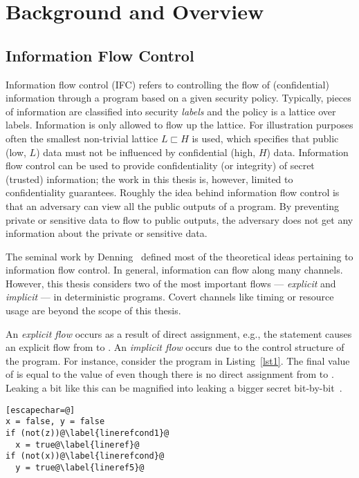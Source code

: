 \chapter{Background and Overview}
\label{ch:background}

\section{Information Flow Control}
Information flow control (IFC) refers to controlling the flow of
(confidential) information through a program based on a given security
policy. Typically, pieces of information are classified into security
\emph{labels} and the policy is a lattice over labels. Information is only
allowed to flow up the lattice. For illustration purposes often the
smallest non-trivial lattice $L \sqsubset H$ is used, which specifies that
public (low, $L$) data must not be influenced by confidential (high,
$H$) data. Information flow control can be used to provide
confidentiality (or integrity) of secret (trusted) information; the
work in this thesis is, however, limited to confidentiality guarantees. 
Roughly the idea behind information flow control is that an adversary
can view all the public outputs of a program. By preventing private or
sensitive data to flow to public outputs, the adversary does not get
any information about the private or sensitive data.

The seminal work by Denning~\cite{denning76,denning77,denning82}
defined most of the theoretical ideas pertaining to information flow
control. In general, information can flow along many
channels. However, this thesis considers two of the most important
flows --- \textit{explicit} and \textit{implicit} --- in deterministic
programs. Covert channels like timing or resource usage are beyond the
scope of this thesis.  

An \emph{explicit flow} occurs as a result of direct assignment, e.g.,
the statement  causes an explicit flow from
 to . An \emph{implicit flow} occurs due to the
control structure of the program. For instance, consider the program
in Listing~\ref{lst1}.  
 The final value of  is equal to the value of
 even though there is no direct assignment from 
to . Leaking a bit like this can be magnified into leaking
a bigger secret bit-by-bit~\cite{askarov}.

\begin{lstlisting}[float,caption=Implicit flow from \TT{z} to
  \TT{y},label=lst1][escapechar=@]
x = false, y = false
if (not(z))@\label{linerefcond1}@
  x = true@\label{lineref}@
if (not(x))@\label{linerefcond}@
  y = true@\label{lineref5}@
\end{lstlisting}

